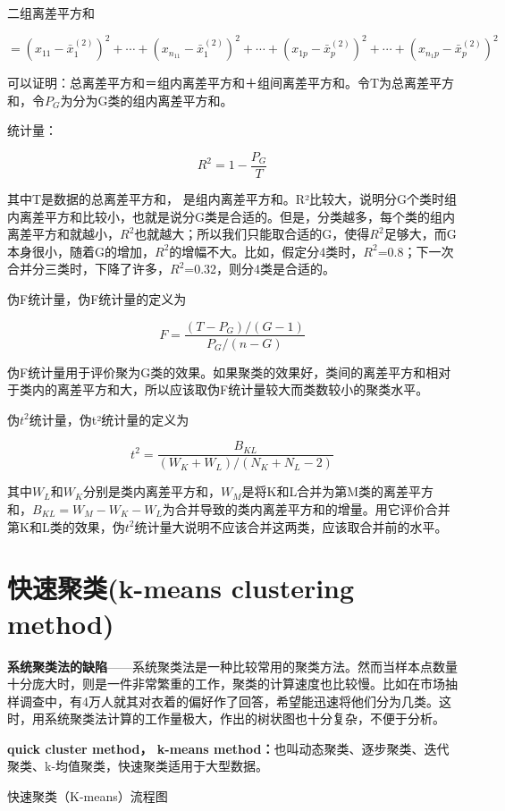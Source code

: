 \documentclass[]{ctexbook}
\begin{document}
二组离差平方和

\[=(x_{11}-\bar x_1^{(2)})^2+\cdots+(x_{n_11}-\bar x_1^{(2)})^2+\cdots+(x_{1p}-\bar x_p^{(2)})^2+\cdots+(x_{n_1p}-\bar x_p^{(2)})^2 \]

可以证明：总离差平方和＝组内离差平方和＋组间离差平方和。令T为总离差平方和，令\(P_G\)为分为G类的组内离差平方和。

统计量：

\[R^2=1-\frac{P_G}{T}\]

其中T是数据的总离差平方和， 是组内离差平方和。R²比较大，说明分G个类时组内离差平方和比较小，也就是说分G类是合适的。但是，分类越多，每个类的组内离差平方和就越小，\(R^2\)也就越大；所以我们只能取合适的G，使得\(R^2\)足够大，而G本身很小，随着G的增加，\(R^2\)的增幅不大。比如，假定分4类时，\(R^2\)=0.8；下一次合并分三类时，下降了许多，\(R^2\)=0.32，则分4类是合适的。

伪F统计量，伪F统计量的定义为

\[F=\frac{(T-P_G)/(G-1)}{P_G/(n-G)}\]

伪F统计量用于评价聚为G类的效果。如果聚类的效果好，类间的离差平方和相对于类内的离差平方和大，所以应该取伪F统计量较大而类数较小的聚类水平。

伪\(t^2\)统计量，伪t²统计量的定义为

\[t^2=\frac{B_{KL}}{(W_K+W_L)/(N_K+N_L-2)}\]

其中\(W_L\)和\(W_K\)分别是类内离差平方和，\(W_M\)是将K和L合并为第M类的离差平方和，\(B_{KL}=W_M-W_K-W_L\)为合并导致的类内离差平方和的增量。用它评价合并第K和L类的效果，伪\(t^2\)统计量大说明不应该合并这两类，应该取合并前的水平。

\hypertarget{ux5febux901fux805aux7c7bk-means-clustering-method}{%
\section{快速聚类(k-means clustering method)}\label{ux5febux901fux805aux7c7bk-means-clustering-method}}

\textbf{系统聚类法的缺陷}------系统聚类法是一种比较常用的聚类方法。然而当样本点数量十分庞大时，则是一件非常繁重的工作，聚类的计算速度也比较慢。比如在市场抽样调查中，有4万人就其对衣着的偏好作了回答，希望能迅速将他们分为几类。这时，用系统聚类法计算的工作量极大，作出的树状图也十分复杂，不便于分析。

\textbf{quick cluster method， k-means method：}也叫动态聚类、逐步聚类、迭代聚类、k-均值聚类，快速聚类适用于大型数据。

快速聚类（K-means）流程图
\end{document}
